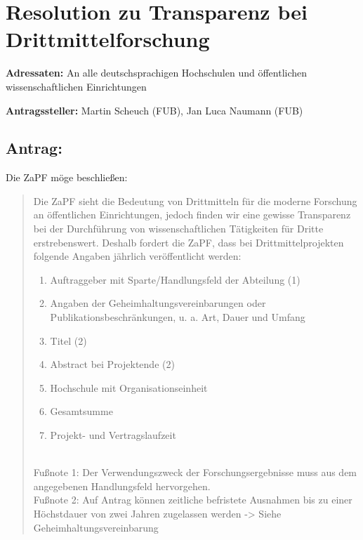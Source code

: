 \documentclass[10pt,oneside]{scrartcl}
\begin{document}
\section*{Resolution zu Transparenz bei Drittmittelforschung}

\textbf{Adressaten:} An alle deutschsprachigen Hochschulen und öffentlichen wissenschaftlichen Einrichtungen

\textbf{Antragssteller:} Martin Scheuch (FUB), Jan Luca Naumann (FUB)

\subsection*{Antrag:}
Die ZaPF möge beschließen:
\begin{quote}
Die ZaPF sieht die Bedeutung von Drittmitteln für die moderne Forschung an öffentlichen Einrichtungen, jedoch finden wir eine gewisse Transparenz bei der Durchführung von wissenschaftlichen Tätigkeiten für Dritte erstrebenswert. Deshalb fordert die ZaPF, dass bei Drittmittelprojekten folgende Angaben jährlich veröffentlicht werden:
\begin{enumerate}
\item Auftraggeber mit Sparte/Handlungsfeld der Abteilung (1)
\item Angaben der Geheimhaltungsvereinbarungen oder Publikationsbeschränkungen, u. a. Art, Dauer und Umfang
\item Titel (2)
\item Abstract bei Projektende (2)
\item Hochschule mit Organisationseinheit
\item Gesamtsumme
\item Projekt- und Vertragslaufzeit 
\end{enumerate}
~\\
Fußnote 1: Der Verwendungszweck der Forschungsergebnisse muss aus dem angegebenen Handlungsfeld hervorgehen.\\

Fußnote 2: Auf Antrag können zeitliche befristete Ausnahmen bis zu einer Höchstdauer von zwei Jahren zugelassen werden -> Siehe Geheimhaltungsvereinbarung\\


\end{quote}
\end{document}
